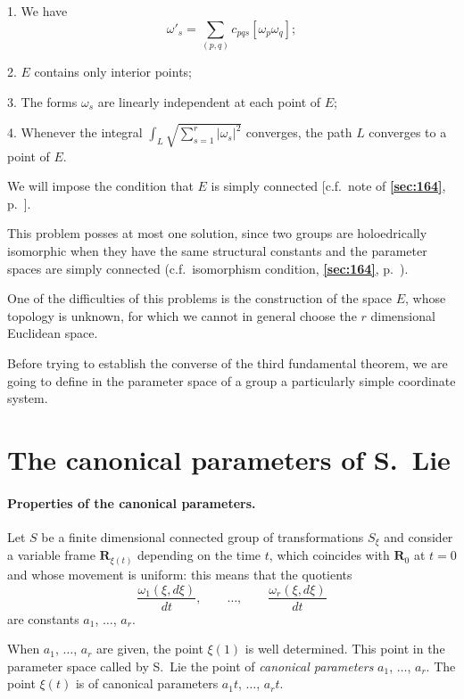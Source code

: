 \documentclass[leqno,11pt]{book}
\numberwithin{equation}{chapter}
\theoremstyle{shape1}
\theoremstyle{shapesmall}
\newcommand{\fsref}[1]{{\rm\textsection\textbf{\ref{sec:#1}}}}
\newcommand{\somespace}{\vspace{9pt}}
\begin{document}
\somespace

1. We have
\[
\omega'_{s}=\sum_{(p,q)}c_{pqs}[\omega_{p}\omega_{q}];
\]

2. $E$ contains only interior points;

3. The forms $\omega_{s}$ are linearly independent at each point of $E$;

4. Whenever the integral $\displaystyle{\int_{L}\sqrt{\sum_{s=1}^{r}|\omega_{s}|^{2}}}$ converges, the path $L$ converges to a point of $E$.

\somespace

We will impose the condition that $E$ is simply connected [c.f.~note of \fsref{164}, p.~\pageref{sec:164}].

This problem posses at most one solution, since two groups are holoedrically isomorphic when they have the same structural constants and the parameter spaces are simply connected (c.f.~isomorphism condition, \fsref{164}, p.~\pageref{sec:164}).

One of the difficulties of this problems is the construction of the space $E$, whose topology is unknown, for which we cannot in general choose the $r$ dimensional Euclidean space.

Before trying to establish the converse of the third fundamental theorem, we are going to define in the parameter space of a group a particularly simple coordinate system.

\section{The canonical parameters of S.~Lie}
\label{sec:canon-param-s}

\paragraph{Properties of the canonical parameters.}
\label{sec:200}
Let $S$ be a finite dimensional connected group of transformations $S_{\xi}$ and consider a variable frame $\mathbf{R}_{\xi(t)}$ depending on the time $t$, which coincides with $\mathbf{R}_{0}$ at $t=0$ and whose movement is uniform: this means that the quotients
\begin{equation}
  \label{eq:13.6}
  \frac{\omega_{1}(\xi,d\xi)}{dt},\qquad\dots,\qquad\frac{\omega_{r}(\xi,d\xi)}{dt}
\end{equation}
are constants $a_{1}$, $\dots$, $a_{r}$.

When $a_{1}$, $\dots$, $a_{r}$ are given, the point $\xi(1)$ is well determined. This point in the parameter space called by S.~Lie the point of \emph{canonical parameters} $a_{1}$, $\dots$, $a_{r}$. The point $\xi(t)$ is of canonical parameters $a_{1}t$, $\dots$, $a_{r}t$.
\end{document}
